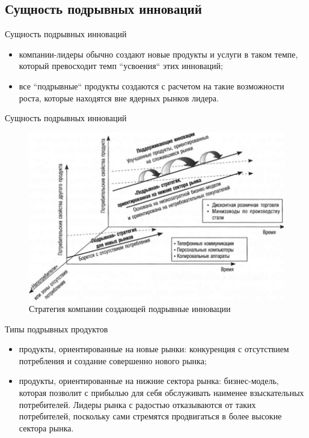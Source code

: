 \documentclass[_Venture_p3.tex]{subfiles}
\begin{document}

\subsection{Сущность подрывных инноваций}
\begin{frame}[shrink=5]{Сущность подрывных инноваций}
\begin{itemize}
	\item компании-лидеры обычно создают новые продукты и услуги в таком темпе, который превосходит темп ``усвоения`` этих инноваций;
	\item все ``подрывные`` продукты создаются с расчетом на такие возможности роста, которые находятся вне ядерных рынков лидера.
\end{itemize}
\end{frame}


\begin{frame}{Сущность подрывных инноваций}
\begin{figure}
	\centering
	\includegraphics[scale=.8]{img/disruptive_innovations_strategy}
	\caption{Стратегия компании создающей подрывные инновации}
\end{figure}
\end{frame}

\begin{frame}{Типы подрывных продуктов}
\begin{itemize}
	\item продукты, ориентированные на новые рынки: конкуренция с отсутствием потребления и создание совершенно нового рынка;
	\item продукты, ориентированные на нижние сектора рынка: бизнес-модель, которая позволит с прибылью для себя обслуживать наименее взыскательных потребителей. Лидеры рынка с радостью отказываются от таких потребителей, поскольку сами стремятся продвигаться в более высокие сектора рынка.
\end{itemize}
\end{frame}
\end{document}
